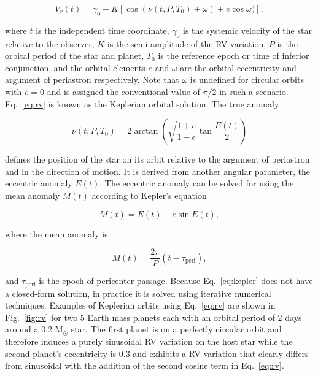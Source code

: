 \begin{equation}
V_r(t) = \gamma_0 + K[\cos{(\nu(t,P,T_0) + \omega)} + e\cos{\omega})],
\label{eq:rv}
\end{equation}

\noindent where $t$ is the independent time coordinate, $\gamma_0$ is the systemic velocity of
the star relative to the observer, $K$ is the semi-amplitude of the RV variation,
$P$ is the orbital period of the star and planet, 
$T_0$ is the reference epoch or time of inferior conjunction, and
the orbital elements $e$ and $\omega$ are the orbital eccentricity and argument of
periastron respectively. Note that $\omega$ is undefined for circular orbits with
$e=0$ and is assigned the conventional value of $\pi/2$ in such a scenario.
Eq.~\ref{eq:rv} is known as the Keplerian orbital solution.
The true anomaly 

\begin{equation}
\nu(t,P,T_0) = 2 \arctan{\left( \sqrt{\frac{1+e}{1-e}} \tan{\frac{E(t)}{2}}  \right)}
\end{equation}

\noindent defines the position of the star on its orbit 
relative to the argument of periastron and in the direction of motion. It is derived 
from another angular parameter, the eccentric anomaly $E(t)$. The eccentric 
anomaly can be solved for using the mean anomaly $M(t)$ according to 
Kepler's equation

\begin{equation}
M(t) = E(t)-e\sin{E(t)},
\label{eq:kepler} 
\end{equation}

\noindent where the mean anomaly is

\begin{equation}
M(t) = \frac{2\pi}{P} (t-\tau_{\mathrm{peri}}), 
\end{equation}

\noindent and $\tau_{\mathrm{peri}}$ is the epoch of 
pericenter passage. Because Eq.~\ref{eq:kepler} does not have a closed-form 
solution, in practice it is solved using iterative numerical techniques. 
Examples of Keplerian orbits using Eq.~\ref{eq:rv} are shown in Fig.~\ref{fig:rv} 
for two 5 Earth mass planets each with an orbital period of 2 days around a 0.2 M$_{\odot}$ 
star. The first planet is on a perfectly circular orbit and therefore induces a purely
sinusoidal RV variation on the host star while the second planet's eccentricity is 0.3 and
exhibits a RV variation that clearly differs from sinusoidal with the addition of the second
cosine term in Eq.~\ref{eq:rv}. \\

